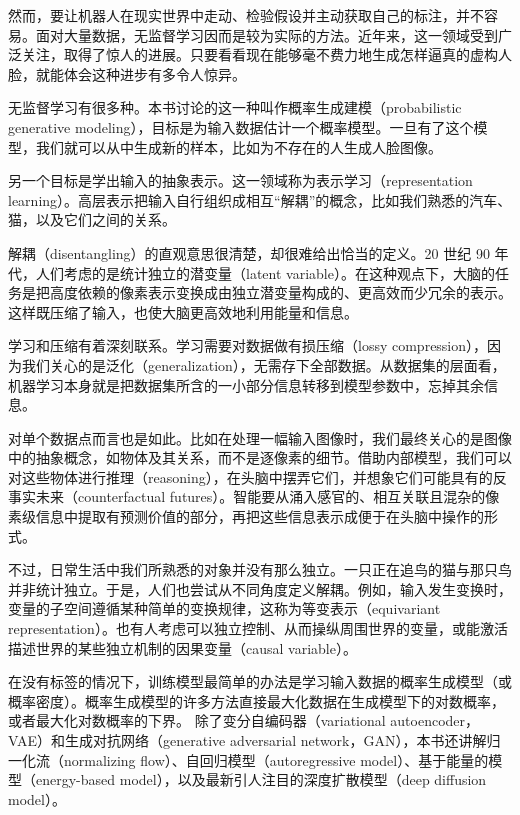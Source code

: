 然而，要让机器人在现实世界中走动、检验假设并主动获取自己的标注，并不容易。面对大量数据，无监督学习因而是较为实际的方法。近年来，这一领域受到广泛关注，取得了惊人的进展。只要看看现在能够毫不费力地生成怎样逼真的虚构人脸，就能体会这种进步有多令人惊异。

无监督学习有很多种。本书讨论的这一种叫作概率生成建模（probabilistic generative modeling），目标是为输入数据估计一个概率模型。一旦有了这个模型，我们就可以从中生成新的样本，比如为不存在的人生成人脸图像。

另一个目标是学出输入的抽象表示。这一领域称为表示学习（representation learning）。高层表示把输入自行组织成相互“解耦”的概念，比如我们熟悉的汽车、猫，以及它们之间的关系。

解耦（disentangling）的直观意思很清楚，却很难给出恰当的定义。20 世纪 90 年代，人们考虑的是统计独立的潜变量（latent variable）。在这种观点下，大脑的任务是把高度依赖的像素表示变换成由独立潜变量构成的、更高效而少冗余的表示。这样既压缩了输入，也使大脑更高效地利用能量和信息。

学习和压缩有着深刻联系。学习需要对数据做有损压缩（lossy compression），因为我们关心的是泛化（generalization），无需存下全部数据。从数据集的层面看，机器学习本身就是把数据集所含的一小部分信息转移到模型参数中，忘掉其余信息。

对单个数据点而言也是如此。比如在处理一幅输入图像时，我们最终关心的是图像中的抽象概念，如物体及其关系，而不是逐像素的细节。借助内部模型，我们可以对这些物体进行推理（reasoning），在头脑中摆弄它们，并想象它们可能具有的反事实未来（counterfactual futures）。智能要从涌入感官的、相互关联且混杂的像素级信息中提取有预测价值的部分，再把这些信息表示成便于在头脑中操作的形式。

不过，日常生活中我们所熟悉的对象并没有那么独立。一只正在追鸟的猫与那只鸟并非统计独立。于是，人们也尝试从不同角度定义解耦。例如，输入发生变换时，变量的子空间遵循某种简单的变换规律，这称为等变表示（equivariant representation）。也有人考虑可以独立控制、从而操纵周围世界的变量，或能激活描述世界的某些独立机制的因果变量（causal variable）。

在没有标签的情况下，训练模型最简单的办法是学习输入数据的概率生成模型（或概率密度）。概率生成模型的许多方法直接最大化数据在生成模型下的对数概率，或者最大化对数概率的下界。
除了变分自编码器（variational autoencoder，VAE）和生成对抗网络（generative adversarial network，GAN），本书还讲解归一化流（normalizing flow）、自回归模型（autoregressive model）、基于能量的模型（energy-based model），以及最新引人注目的深度扩散模型（deep diffusion model）。

